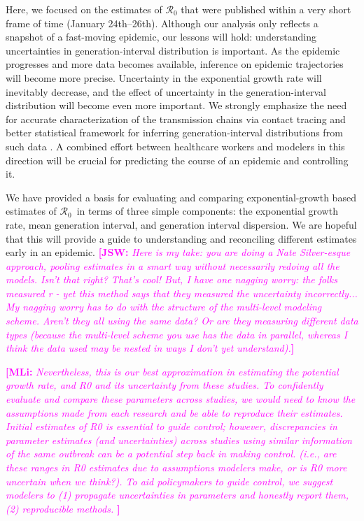 \documentclass[12pt]{article}
\newcommand{\Rx}[1]{\ensuremath{{\mathcal R}_{#1}}}
\newcommand{\Ro}{\Rx{0}\xspace}
\newcommand{\comment}[3]{\textcolor{#1}{\textbf{[#2: }\textsl{#3}\textbf{]}}}
\newcommand{\jsw}[1]{\comment{magenta}{JSW}{#1}}
\newcommand{\mli}[1]{\comment{magenta}{MLi}{#1}}
\begin{document}
Here, we focused on the estimates of \Ro that were published within a very short frame of time (January 24th--26th).
Although our analysis only reflects a snapshot of a fast-moving epidemic, our lessons will hold: understanding uncertainties in generation-interval distribution is important.
As the epidemic progresses and more data becomes available, inference on epidemic trajectories will become more precise.
Uncertainty in the exponential growth rate will inevitably decrease,
and the effect of uncertainty in the generation-interval distribution will become even more important.
We strongly emphasize the need for accurate characterization of the transmission chains via contact tracing and better statistical framework for inferring generation-interval distributions from such data \citep{britton2019estimation}.
A combined effort between healthcare workers and modelers in this direction will be crucial for predicting the course of an epidemic and controlling it.

We have provided a basis for evaluating and comparing exponential-growth based estimates of \Ro\ in terms of three simple components: the exponential growth rate, mean generation interval, and generation interval dispersion. We are hopeful that this will provide a guide to understanding and reconciling different estimates early in an epidemic.
\jsw{Here is my take: you are doing a Nate Silver-esque approach, pooling estimates in a smart way without necessarily redoing all the models. Isn't that right? That's cool!  
But, I have one nagging worry: the folks measured r - yet this method says that they measured the uncertainty incorrectly... My nagging worry has to do with the structure of the multi-level modeling scheme. Aren't they all using the same data? Or are they measuring different data types (because the multi-level scheme you use has the data in parallel, whereas I think the data used may be nested in ways I don't yet understand).}

\mli{Nevertheless, this is our best approximation in estimating the potential growth rate, and R0 and its uncertainty from these studies. To confidently evaluate and compare these parameters across studies, we would need to know the assumptions made from each research and be able to reproduce their estimates. Initial estimates of R0 is essential to guide control; however, discrepancies in parameter estimates (and uncertainties) across studies using similar information of the same outbreak can be a potential step back in making control. (i.e., are these ranges in R0 estimates due to assumptions modelers make, or is R0 more uncertain when we think?). To aid policymakers to guide control, we suggest modelers to (1) propagate uncertainties in parameters and honestly report them, (2) reproducible methods. 
}
\end{document}
